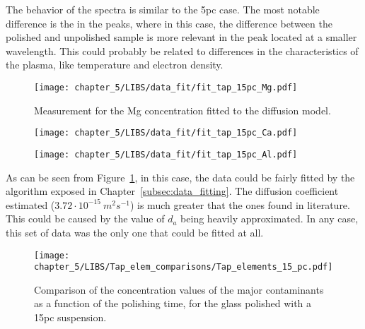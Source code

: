  The behavior of the spectra is similar to the 5pc case. The most notable difference is the in the  peaks, where in this case, the difference between the polished and unpolished sample is more relevant in the peak located at a  smaller wavelength. This could probably be related to differences in the characteristics of the plasma, like temperature and electron density.

\begin{figure}[H]
    \centering
    \texttt{[image: chapter\_5/LIBS/data\_fit/fit\_tap\_15pc\_Mg.pdf]} 
    \vspace{-30pt}
    \caption{Measurement for the Mg concentration fitted to the diffusion model.}
    \label{fig:fit_tap_15pc}
 \end{figure}

 \begin{figure}[H]
    \centering
    \texttt{[image: chapter\_5/LIBS/data\_fit/fit\_tap\_15pc\_Ca.pdf]} 
 \end{figure}
    \vspace{-44pt}
 \begin{figure}[H]
    \centering
    \texttt{[image: chapter\_5/LIBS/data\_fit/fit\_tap\_15pc\_Al.pdf]} 
 \end{figure}
 \vspace{-20pt}
 As can be seen from Figure~\ref{fig:fit_tap_15pc}, in this case, the data could be fairly fitted by the algorithm exposed in Chapter~\ref{subsec:data_fitting}. The diffusion coefficient estimated ($3.72 \cdot 10^{-15}\: m^2s^{-1}$) is much greater that the ones found in literature. This could be caused by the value of $d_a$ being heavily approximated. In any case, this set of data was the only one that could be fitted at all.

 \vspace{-20pt}
 \begin{figure}[H]
    \centering
    \texttt{[image: chapter\_5/LIBS/Tap\_elem\_comparisons/Tap\_elements\_15\_pc.pdf]} 
    \vspace*{-30pt}
    \caption{Comparison of the concentration values of the major contaminants as a function of the polishing time, for the glass polished with a 15pc suspension.}
    \label{fig:tap_elem_15pc}
    \vspace*{-10pt}
 \end{figure}

